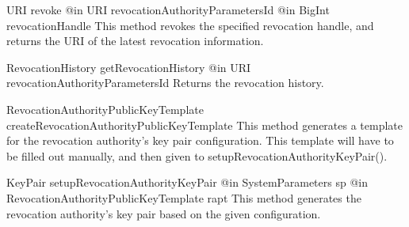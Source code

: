       \begin{method}
      {URI}
      {revoke}
      {
        {@in URI revocationAuthorityParametersId}
        {@in BigInt revocationHandle}
      }
      This method revokes the specified revocation handle, and returns the URI of the latest
      revocation information.
      \end{method}
      
      \begin{method}
      {RevocationHistory}
      {getRevocationHistory}
      {
        {@in URI revocationAuthorityParametersId}
      }
      Returns the revocation history.
      \end{method}
      
      \begin{method}
      {RevocationAuthorityPublicKeyTemplate}
      {createRevocationAuthorityPublicKeyTemplate}
      {
      }
      This method generates a template for the revocation authority's key pair configuration.
      This template will have to be filled out manually, and then given to setupRevocationAuthorityKeyPair().
      \end{method}
      
      \begin{method}
      {KeyPair}
      {setupRevocationAuthorityKeyPair}
      {
        {@in SystemParameters sp}
        {@in RevocationAuthorityPublicKeyTemplate rapt}
      }
      This method generates the revocation authority's key pair based on the given configuration.
      \end{method}
      
     
